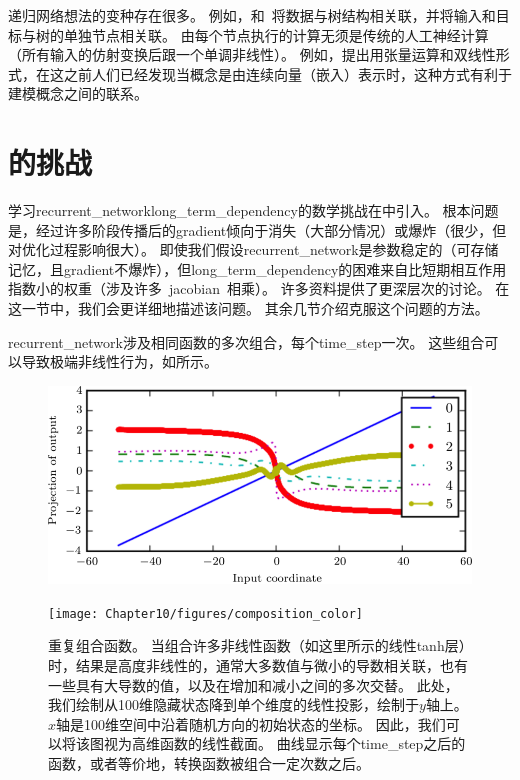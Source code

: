 递归网络想法的变种存在很多。
例如，\cite{Frasconi97}和~\cite{Frasconi-1998}将数据与树结构相关联，并将输入和目标与树的单独节点相关联。
由每个节点执行的计算无须是传统的人工神经计算（所有输入的仿射变换后跟一个单调非线性）。
例如，\cite{Socher-et-al-EMNLP2013}提出用张量运算和双线性形式，在这之前人们已经发现当概念是由连续向量（嵌入）表示时，这种方式有利于建模概念之间的联系\citep{weston_large_2010,Bordes-et-al-AISTATS2012-small}。

\section{的挑战}
\label{sec:the_challenge_of_long_term_dependencies}
学习\gls{recurrent_network}\gls{long_term_dependency}的数学挑战在中引入。
根本问题是，经过许多阶段传播后的\gls{gradient}倾向于消失（大部分情况）或爆炸（很少，但对优化过程影响很大）。
即使我们假设\gls{recurrent_network}是参数稳定的（可存储记忆，且\gls{gradient}不爆炸），但\gls{long_term_dependency}的困难来自比短期相互作用指数小的权重（涉及许多~\gls{jacobian}~相乘）。
许多资料提供了更深层次的讨论\citep{Hochreiter91,Doya93,Bengio1994ITNN,Pascanu+al-ICML2013-small}。
在这一节中，我们会更详细地描述该问题。
其余几节介绍克服这个问题的方法。


\gls{recurrent_network}涉及相同函数的多次组合，每个\gls{time_step}一次。
这些组合可以导致极端非线性行为，如所示。
\begin{figure}[!htb]
\ifOpenSource
\centerline{\includegraphics[scale=0.5]{images/103.png}}
\else
\centerline{\texttt{[image: Chapter10/figures/composition\_color]}}
\fi
\caption{重复组合函数。
当组合许多非线性函数（如这里所示的线性tanh层）时，结果是高度非线性的，通常大多数值与微小的导数相关联，也有一些具有大导数的值，以及在增加和减小之间的多次交替。%
此处，我们绘制从100维隐藏状态降到单个维度的线性投影，绘制于$y$轴上。
$x$轴是100维空间中沿着随机方向的初始状态的坐标。
因此，我们可以将该图视为高维函数的线性截面。
曲线显示每个\gls{time_step}之后的函数，或者等价地，转换函数被组合一定次数之后。
}
\label{fig:chap10_composition_color}
\end{figure}

